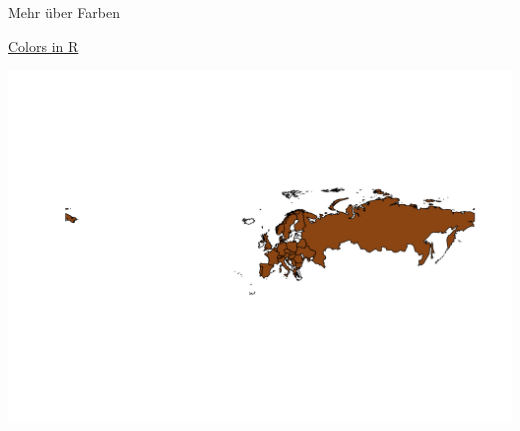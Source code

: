 \documentclass[ignorenonframetext,]{beamer}
\newenvironment{Shaded}{\begin{snugshade}}{\end{snugshade}}
\newcommand{\DataTypeTok}[1]{\textcolor[rgb]{0.74,0.68,0.62}{\underline{#1}}}
\newcommand{\KeywordTok}[1]{\textcolor[rgb]{0.26,0.66,0.93}{\textbf{#1}}}
\newcommand{\NormalTok}[1]{\textcolor[rgb]{0.74,0.68,0.62}{#1}}
\newcommand{\OperatorTok}[1]{\textcolor[rgb]{0.74,0.68,0.62}{#1}}
\newcommand{\StringTok}[1]{\textcolor[rgb]{0.02,0.61,0.04}{#1}}
\begin{document}
\begin{frame}[fragile]{Mehr über Farben}
\protect\hypertarget{mehr-uber-farben}{}

\href{http://www.stat.columbia.edu/~tzheng/files/Rcolor.pdf}{Colors in
R}

\begin{Shaded}
\end{Shaded}

\includegraphics{Geomedizin_files/figure-beamer/unnamed-chunk-78-1.pdf}

\end{frame}
\end{document}
